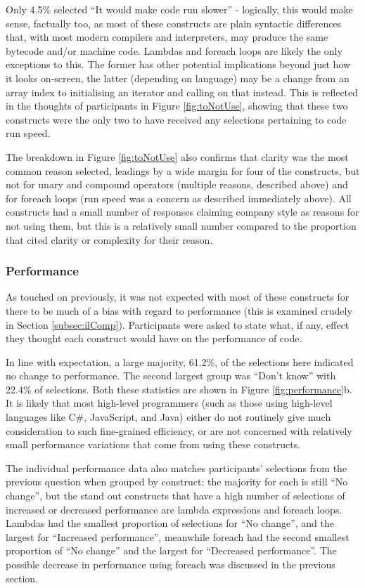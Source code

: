 \documentclass{article}
\begin{document}
            Only 4.5\% selected ``It would make code run slower'' - logically, this would make sense, factually too, as most of these constructs are plain syntactic differences that, with most modern compilers and interpreters, may produce the same bytecode and/or machine code. Lambdas and foreach loops are likely the only exceptions to this. The former has other potential implications beyond just how it looks on-screen, the latter (depending on language) may be a change from an array index to initialising an iterator and calling on that instead. This is reflected in the thoughts of participants in Figure \ref{fig:toNotUse}, showing that these two constructs were the only two to have received any selections pertaining to code run speed.

            The breakdown in Figure \ref{fig:toNotUse} also confirms that clarity was the most common reason selected, leadings by a wide margin for four of the constructs, but not for unary and compound operators (multiple reasons, described above) and for foreach loops (run speed was a concern as described immediately above).
            All constructs had a small number of responses claiming company style as reasons for not using them, but this is a relatively small number compared to the proportion that cited clarity or complexity for their reason.
        \subsubsection{Performance}
            As touched on previously, it was not expected with most of these constructs for there to be much of a bias with regard to performance (this is examined crudely in Section \ref{subsec:ilComp}). Participants were asked to state what, if any, effect they thought each construct would have on the performance of code.
            \newline

            In line with expectation, a large majority, 61.2\%, of the selections here indicated no change to performance. The second largest group was ``Don't know'' with 22.4\% of selections. Both these statistics are shown in Figure \ref{fig:performance}b. It is likely that most high-level programmers (such as those using high-level languages like C\#, JavaScript, and Java) either do not routinely give much consideration to such fine-grained efficiency, or are not concerned with relatively small performance variations that come from using these constructs.

            The individual performance data also matches participants' selections from the previous question when grouped by construct: the majority for each is still ``No change'', but the stand out constructs that have a high number of selections of increased or decreased performance are lambda expressions and foreach loops. Lambdas had the smallest proportion of selections for ``No change'', and the largest for ``Increased performance'', meanwhile foreach had the second smallest proportion of ``No change'' and the largest for ``Decreased performance''. The possible decrease in performance using foreach was discussed in the previous section.
\end{document}
